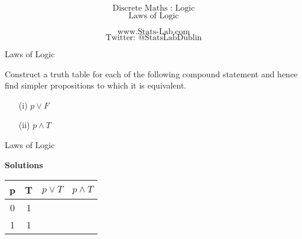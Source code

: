 \documentclass{beamer}
\begin{document}


\begin{frame}
\Huge
\[\mbox{Discrete Maths :  Logic}\]
\[\mbox{Laws of Logic}\]
\bigskip

\[\mbox{www.Stats-Lab.com}\]
\[\mbox{Twitter: @StatsLabDublin}\]
\end{frame}

\begin{frame}

{Laws of Logic}

Construct a truth table for each of the following compound statement and hence find simpler propositions to which it is equivalent.


\begin{itemize}
\item[(i)] $p \vee F$
\item[(ii)] $p \wedge T$
\end{itemize}
\end{frame}
\begin{frame}
{Laws of Logic}

\textbf{Solutions}
\begin{center}

\begin{tabular}{|c|c||c||c|}
\hline  \phantom{sp}p\phantom{sp}&  \phantom{sp}T\phantom{sp}& $p \vee T$ & $ p \wedge T$ \\ \hline
\hline  0 & 1 &  &  \\ 
\hline  1 &  1 &  &  \\ 
\hline 
\end{tabular} 
\end{center}
\end{frame}
\end{document}
